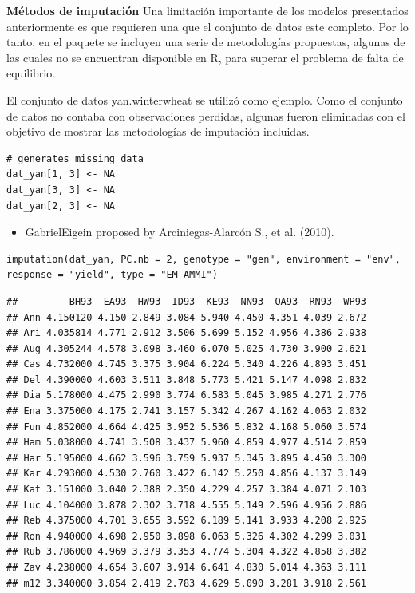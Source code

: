 \textbf{Métodos de imputación}
Una limitación importante de los modelos presentados anteriormente es que requieren una que el conjunto de datos este completo. Por lo tanto, en el paquete se incluyen una serie de metodologías propuestas, algunas de las cuales no se encuentran disponible en R, para superar el problema de falta de equilibrio. 

El conjunto de datos yan.winterwheat se utilizó como ejemplo. Como el conjunto de datos no contaba con observaciones perdidas, algunas fueron eliminadas con el objetivo de mostrar las metodologías de imputación incluidas.

\begin{lstlisting}
# generates missing data
dat_yan[1, 3] <- NA
dat_yan[3, 3] <- NA
dat_yan[2, 3] <- NA
\end{lstlisting}


\begin{itemize}
\item GabrielEigein proposed by Arciniegas-Alarcón S., et al. (2010).
\end{itemize}
\begin{lstlisting}
imputation(dat_yan, PC.nb = 2, genotype = "gen", environment = "env", response = "yield", type = "EM-AMMI")
\end{lstlisting}
\centering
\begin{small}
\begin{Verbatim}[frame=single,baselinestretch=0.3]
##         BH93  EA93  HW93  ID93  KE93  NN93  OA93  RN93  WP93
## Ann 4.150120 4.150 2.849 3.084 5.940 4.450 4.351 4.039 2.672
## Ari 4.035814 4.771 2.912 3.506 5.699 5.152 4.956 4.386 2.938
## Aug 4.305244 4.578 3.098 3.460 6.070 5.025 4.730 3.900 2.621
## Cas 4.732000 4.745 3.375 3.904 6.224 5.340 4.226 4.893 3.451
## Del 4.390000 4.603 3.511 3.848 5.773 5.421 5.147 4.098 2.832
## Dia 5.178000 4.475 2.990 3.774 6.583 5.045 3.985 4.271 2.776
## Ena 3.375000 4.175 2.741 3.157 5.342 4.267 4.162 4.063 2.032
## Fun 4.852000 4.664 4.425 3.952 5.536 5.832 4.168 5.060 3.574
## Ham 5.038000 4.741 3.508 3.437 5.960 4.859 4.977 4.514 2.859
## Har 5.195000 4.662 3.596 3.759 5.937 5.345 3.895 4.450 3.300
## Kar 4.293000 4.530 2.760 3.422 6.142 5.250 4.856 4.137 3.149
## Kat 3.151000 3.040 2.388 2.350 4.229 4.257 3.384 4.071 2.103
## Luc 4.104000 3.878 2.302 3.718 4.555 5.149 2.596 4.956 2.886
## Reb 4.375000 4.701 3.655 3.592 6.189 5.141 3.933 4.208 2.925
## Ron 4.940000 4.698 2.950 3.898 6.063 5.326 4.302 4.299 3.031
## Rub 3.786000 4.969 3.379 3.353 4.774 5.304 4.322 4.858 3.382
## Zav 4.238000 4.654 3.607 3.914 6.641 4.830 5.014 4.363 3.111
## m12 3.340000 3.854 2.419 2.783 4.629 5.090 3.281 3.918 2.561
\end{Verbatim}
\end{small}


